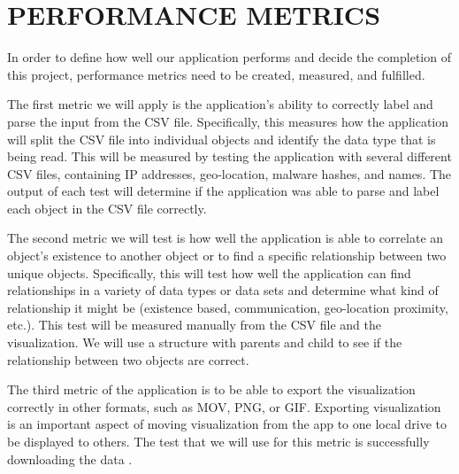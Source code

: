 \documentclass[journal,10pt,onecolumn,compsoc]{IEEEtran} \usepackage[margin=1.0in]{geometry} \usepackage{pdfpages}
\begin{document}
\section{PERFORMANCE METRICS}
In order to define how well our application performs and decide the completion of this project, performance metrics need to be created, measured, and fulfilled.

\noindent \newline The first metric we will apply is the application's ability to correctly label and parse the input from the CSV file. Specifically, this measures how the application will split the CSV file into individual objects and identify the data type that is being read. This will be measured by testing the application with several different CSV files, containing IP addresses, geo-location, malware hashes, and names. The output of each test will determine if the application was able to parse and label each object in the CSV file correctly.

\noindent \newline The second metric we will test is how well the application is able to correlate an object's existence to another object or to find a specific relationship between two unique objects. Specifically, this will test how well the application can find relationships in a variety of data types or data sets and determine what kind of relationship it might be (existence based, communication, geo-location proximity, etc.). This test will be measured manually from the CSV file and the visualization. We will use a structure with parents and child to see if the relationship between two objects are correct.

\noindent \newline The third metric of the application is to be able to export the visualization correctly in other formats, such as MOV, PNG, or GIF. Exporting visualization is an important aspect of moving visualization from the app to one local drive to be displayed to others. The test that we will use for this metric is successfully downloading the data .
 
 \newpage  



\end{document}
